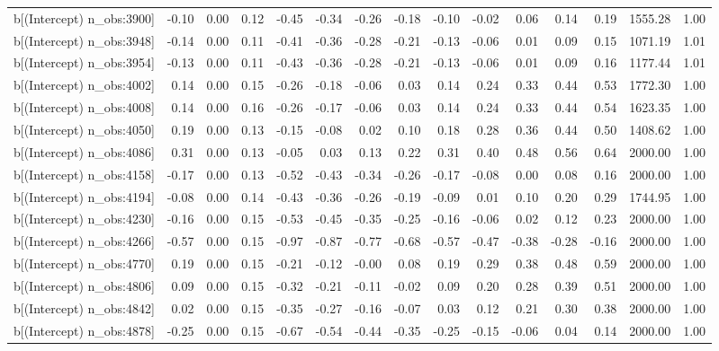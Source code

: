 \begin{table}[ht]
\begin{tabular}{rrrrrrrrrrrrrrr}
  b[(Intercept) n\_obs:3900] & -0.10 & 0.00 & 0.12 & -0.45 & -0.34 & -0.26 & -0.18 & -0.10 & -0.02 & 0.06 & 0.14 & 0.19 & 1555.28 & 1.00 \\ 
  b[(Intercept) n\_obs:3948] & -0.14 & 0.00 & 0.11 & -0.41 & -0.36 & -0.28 & -0.21 & -0.13 & -0.06 & 0.01 & 0.09 & 0.15 & 1071.19 & 1.01 \\ 
  b[(Intercept) n\_obs:3954] & -0.13 & 0.00 & 0.11 & -0.43 & -0.36 & -0.28 & -0.21 & -0.13 & -0.06 & 0.01 & 0.09 & 0.16 & 1177.44 & 1.01 \\ 
  b[(Intercept) n\_obs:4002] & 0.14 & 0.00 & 0.15 & -0.26 & -0.18 & -0.06 & 0.03 & 0.14 & 0.24 & 0.33 & 0.44 & 0.53 & 1772.30 & 1.00 \\ 
  b[(Intercept) n\_obs:4008] & 0.14 & 0.00 & 0.16 & -0.26 & -0.17 & -0.06 & 0.03 & 0.14 & 0.24 & 0.33 & 0.44 & 0.54 & 1623.35 & 1.00 \\ 
  b[(Intercept) n\_obs:4050] & 0.19 & 0.00 & 0.13 & -0.15 & -0.08 & 0.02 & 0.10 & 0.18 & 0.28 & 0.36 & 0.44 & 0.50 & 1408.62 & 1.00 \\ 
  b[(Intercept) n\_obs:4086] & 0.31 & 0.00 & 0.13 & -0.05 & 0.03 & 0.13 & 0.22 & 0.31 & 0.40 & 0.48 & 0.56 & 0.64 & 2000.00 & 1.00 \\ 
  b[(Intercept) n\_obs:4158] & -0.17 & 0.00 & 0.13 & -0.52 & -0.43 & -0.34 & -0.26 & -0.17 & -0.08 & 0.00 & 0.08 & 0.16 & 2000.00 & 1.00 \\ 
  b[(Intercept) n\_obs:4194] & -0.08 & 0.00 & 0.14 & -0.43 & -0.36 & -0.26 & -0.19 & -0.09 & 0.01 & 0.10 & 0.20 & 0.29 & 1744.95 & 1.00 \\ 
  b[(Intercept) n\_obs:4230] & -0.16 & 0.00 & 0.15 & -0.53 & -0.45 & -0.35 & -0.25 & -0.16 & -0.06 & 0.02 & 0.12 & 0.23 & 2000.00 & 1.00 \\ 
  b[(Intercept) n\_obs:4266] & -0.57 & 0.00 & 0.15 & -0.97 & -0.87 & -0.77 & -0.68 & -0.57 & -0.47 & -0.38 & -0.28 & -0.16 & 2000.00 & 1.00 \\ 
  b[(Intercept) n\_obs:4770] & 0.19 & 0.00 & 0.15 & -0.21 & -0.12 & -0.00 & 0.08 & 0.19 & 0.29 & 0.38 & 0.48 & 0.59 & 2000.00 & 1.00 \\ 
  b[(Intercept) n\_obs:4806] & 0.09 & 0.00 & 0.15 & -0.32 & -0.21 & -0.11 & -0.02 & 0.09 & 0.20 & 0.28 & 0.39 & 0.51 & 2000.00 & 1.00 \\ 
  b[(Intercept) n\_obs:4842] & 0.02 & 0.00 & 0.15 & -0.35 & -0.27 & -0.16 & -0.07 & 0.03 & 0.12 & 0.21 & 0.30 & 0.38 & 2000.00 & 1.00 \\ 
  b[(Intercept) n\_obs:4878] & -0.25 & 0.00 & 0.15 & -0.67 & -0.54 & -0.44 & -0.35 & -0.25 & -0.15 & -0.06 & 0.04 & 0.14 & 2000.00 & 1.00 \\ 

\end{tabular}
\end{table}
